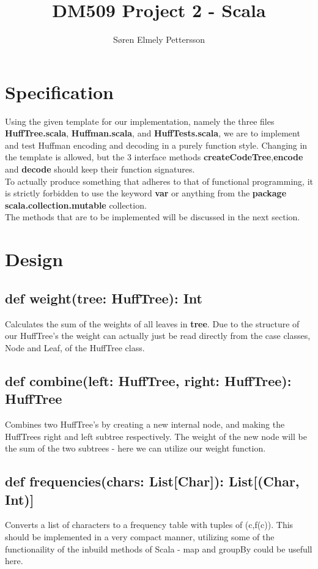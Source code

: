 \documentclass{article}
\author{S\o{}ren Elmely Pettersson }
\title{DM509 Project 2 - Scala}
\begin{document}
\maketitle
\newpage

\newpage
\section{Specification}
Using the given template for our implementation, namely the three files \textbf{HuffTree.scala}, \textbf{Huffman.scala}, and \textbf{HuffTests.scala}, we are to implement and test Huffman encoding and decoding in a purely function style. Changing in the template is allowed, but the 3 interface methods \textbf{createCodeTree},\textbf{encode} and \textbf{decode} should keep their function signatures.  
\\
\newline
To actually produce something that adheres to that of functional programming, it is strictly forbidden to use the keyword \textbf{var} or anything from the \textbf{package scala.collection.mutable} collection.
\newline
\\
The methods that are to be implemented will be discussed in the next section.

\section{Design}
\subsection{def weight(tree: HuffTree): Int}
Calculates the sum of the weights of all leaves in \textbf{tree}. Due to the structure of our HuffTree's the weight can actually just be read directly from the case classes, Node and Leaf, of the HuffTree class.
\subsection{def combine(left: HuffTree, right: HuffTree): HuffTree}
Combines two HuffTree's by creating a new internal node, and making the HuffTrees right and left subtree respectively. The weight of the new node will be the sum of the two subtrees - here we can utilize our weight function. 
\subsection{def frequencies(chars: List[Char]): List[(Char, Int)]}
Converts a list of characters to a frequency table with tuples of (c,f(c)). This should be implemented in a very compact manner, utilizing some of the functionaility of the inbuild methods of Scala - map and groupBy could be usefull here. 
\end{document}
